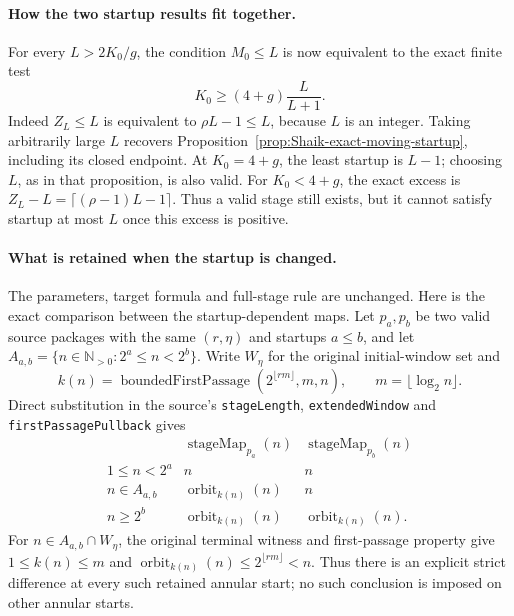 \paragraph{How the two startup results fit together.}
For every \(L>2K_0/g\), the condition \(M_0\le L\) is now
equivalent to the exact finite test
\begin{equation}\label{eq:Shaik-finite-moving-threshold}
 K_0\ge(4+g)\frac{L}{L+1}.
\end{equation}
Indeed \(Z_L\le L\) is equivalent to \(\rho L-1\le L\),
because \(L\) is an integer. Taking arbitrarily large \(L\)
recovers Proposition~\ref{prop:Shaik-exact-moving-startup},
including its closed endpoint. At \(K_0=4+g\), the least
startup is \(L-1\); choosing \(L\), as in that proposition,
is also valid. For \(K_0<4+g\), the exact excess is
\(Z_L-L=\lceil(\rho-1)L-1\rceil\).
Thus a valid stage still exists, but it cannot satisfy
startup at most \(L\) once this excess is positive.

\paragraph{What is retained when the startup is changed.}
The parameters, target formula and full-stage rule are unchanged.
Here is the exact comparison between the startup-dependent maps.
Let \(p_a,p_b\) be two valid source packages with the same
\((r,\eta)\) and startups \(a\le b\), and let
\(A_{a,b}=\{n\in\mathbb N_{>0}:2^a\le n<2^b\}\).
Write \(W_\eta\) for the original initial-window set and
\[
 k(n)=\operatorname{boundedFirstPassage}
       (2^{\lfloor r m\rfloor},m,n),\qquad m=\lfloor\log_2 n\rfloor.
\]
Direct substitution in the source's \texttt{stageLength},
\texttt{extendedWindow} and \texttt{firstPassagePullback} gives
\begin{equation}\label{eq:Shaik-startup-map-comparison}
 \begin{array}{c|c|c}
 &\operatorname{stageMap}_{p_a}(n)&
   \operatorname{stageMap}_{p_b}(n)\\ \hline
 1\le n<2^a&n&n\\
 n\in A_{a,b}&\operatorname{orbit}_{k(n)}(n)&n\\
 n\ge2^b&\operatorname{orbit}_{k(n)}(n)&
          \operatorname{orbit}_{k(n)}(n).
 \end{array}
\end{equation}
For \(n\in A_{a,b}\cap W_\eta\), the original terminal witness
and first-passage property give
\(1\le k(n)\le m\) and
\(\operatorname{orbit}_{k(n)}(n)\le2^{\lfloor rm\rfloor}<n\).
Thus there is an explicit strict difference at every such retained
annular start; no such conclusion is imposed on other annular starts.

